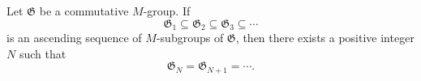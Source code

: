 Let $\mathfrak{G}$ be a commutative $M$-group. If
\[
\mathfrak{G}_1 \subseteq \mathfrak{G}_2 \subseteq \mathfrak{G}_3 \subseteq \cdots
\]
is an ascending sequence of $M$-subgroups of $\mathfrak{G}$, then there exists a positive integer $N$ such that
\[
\mathfrak{G}_N = \mathfrak{G}_{N+1} = \cdots.
\]
